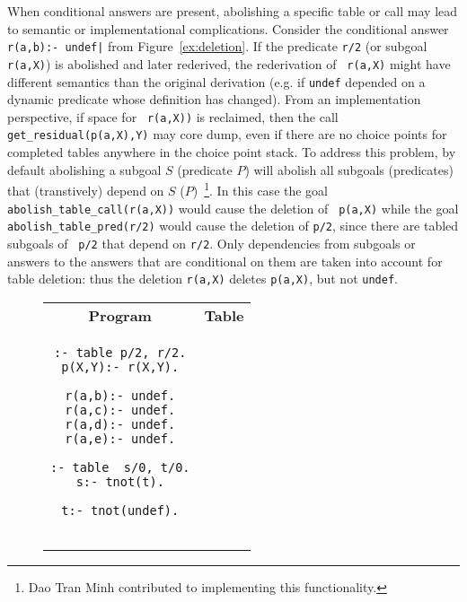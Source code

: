 \begin{description}
When conditional answers are present, abolishing a specific table or
call may lead to semantic or implementational complications.  Consider
the conditional answer {\tt r(a,b):- undef|} from
Figure~\ref{ex:deletion}.  If the predicate {\tt r/2} (or subgoal {\tt
  r(a,X)}) is abolished and later rederived, the rederivation of {\tt
  r(a,X)} might have different semantics than the original derivation
(e.g. if {\tt undef} depended on a dynamic predicate whose definition
has changed).  From an implementation perspective, if space for {\tt
  r(a,X))} is reclaimed, then the call {\tt get\_residual(p(a,X),Y)}
may core dump, even if there are no choice points for completed tables
anywhere in the choice point stack.  To address this problem, by
default abolishing a subgoal $S$ (predicate $P$) will abolish all
subgoals (predicates) that (transtively) depend on $S$
($P$)~\footnote{Dao Tran Minh contributed to implementing this
  functionality.}.  In this case the goal {\tt
  abolish\_table\_call(r(a,X))} would cause the deletion of {\tt
  p(a,X)} while the goal {\tt abolish\_table\_pred(r/2)} would cause
the deletion of {\tt p/2}, since there are tabled subgoals of {\tt
  p/2} that depend on {\tt r/2}.  Only dependencies from subgoals or
answers to the answers that are conditional on them are taken into
account for table deletion: thus the deletion {\tt r(a,X)} deletes
{\tt p(a,X)}, but not {\tt undef}.

\begin{figure}[htb]
\begin{center}
\begin{tabular}{cc}\hline \hline
\rule[-2ex]{0ex}{5ex} \textbf{Program} & \textbf{Table} \\
\begin{minipage}{14.5em}
\begin{verbatim}
:- table p/2, r/2.
p(X,Y):- r(X,Y).

r(a,b):- undef.
r(a,c):- undef.
r(a,d):- undef.
r(a,e):- undef.

:- table  s/0, t/0.
s:- tnot(t).

t:- tnot(undef).


\end{verbatim}
\end{minipage}
\end{tabular}
\end{center}
\end{figure}
\end{description}
